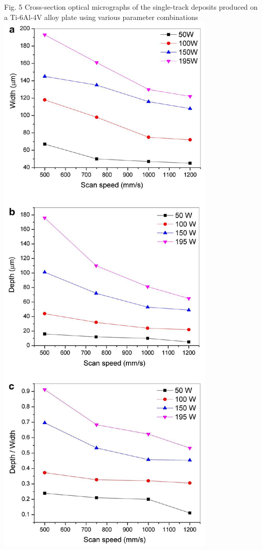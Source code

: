 \documentclass[10pt]{article}
\begin{document}
Fig. 5 Cross-section optical micrographs of the single-track deposits produced on a Ti-6Al-4V alloy plate using various parameter combinations\\
\includegraphics[max width=\textwidth, center]{2024_02_28_5b6806184856c64a957ag-06}
\end{document}
